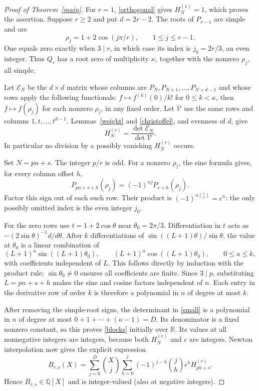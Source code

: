\documentclass[10pt]{article}
\begin{document}
\begin{proof}[Proof of Theorem~\ref{main}]
For $r=1$, \eqref{orthogonal} gives $H_N^{(1)}=1$, which proves
the assertion. Suppose $r\ge2$ and put $d=2r-2$.
The roots of $P_{r-1}$ are simple and are
\[
 \rho_j=1+2\cos(j\pi/r),\qquad 1\le j\le r-1.
\]
One equals zero exactly when $3\mid r$, in which case its index is
$j_0=2r/3$, an even integer. Thus $Q_r$ has a root zero of
multiplicity $\kappa$, together with the nonzero $\rho_j$, all simple.

Let $\mathcal E_N$ be the $d\times d$ matrix whose columns are
$P_N,P_{N+1},\ldots,P_{N+d-1}$ and whose rows apply the following
functionals: $f\mapsto f^{(k)}(0)/k!$ for $0\le k<\kappa$, then
$f\mapsto f(\rho_j)$ for each nonzero $\rho_j$, in any fixed order.
Let $\mathcal V$ use the same rows and columns $1,t,\ldots,t^{d-1}$.
Lemmas~\ref{weight} and \ref{christoffel}, and evenness of $d$, give
\begin{equation}\label{small}
 H_N^{(r)}=\frac{\det\mathcal E_N}{\det\mathcal V}.
\end{equation}
In particular no division by a possibly vanishing $H_N^{(r)}$ occurs.

Set $N=pn+s$. The integer $p/r$ is odd. For a nonzero $\rho_j$,
the sine formula gives, for every column offset $h$,
\[
 P_{pn+s+h}(\rho_j)=(-1)^{nj}P_{s+h}(\rho_j).
\]
Factor this sign out of each such row. Their product is
$(-1)^{n\binom r2}=\epsilon^n$: the only possibly omitted index
is the even integer $j_0$.

For the zero rows use $t=1+2\cos\theta$ near $\theta_0=2\pi/3$.
Differentiation in $t$ acts as
$-(2\sin\theta)^{-1}d/d\theta$. After $k$ differentiations of
$\sin((L+1)\theta)/\sin\theta$, the value at $\theta_0$ is a
linear combination of
\[
 (L+1)^a\sin((L+1)\theta_0),\qquad
 (L+1)^a\cos((L+1)\theta_0),\qquad 0\le a\le k,
\]
with coefficients independent of $L$. This follows directly by
induction with the product rule; $\sin\theta_0\ne0$ ensures all
coefficients are finite. Since $3\mid p$, substituting $L=pn+s+h$
makes the sine and cosine factors independent of $n$.
Each entry in the derivative row of order $k$ is therefore a
polynomial in $n$ of degree at most $k$.

After removing the simple-root signs, the determinant in
\eqref{small} is a polynomial in $n$ of degree at most
$0+1+\cdots+(\kappa-1)=D$. Its denominator is a fixed nonzero
constant, so this proves \eqref{blocks} initially over $\mathbb R$.
Its values at all nonnegative integers are integers, because both
$H_N^{(r)}$ and $\epsilon$ are integers. Newton interpolation now
gives the explicit expression
\begin{equation}\label{newton}
 B_{r,s}(X)=\sum_{j=0}^{D}\binom Xj
 \sum_{h=0}^{j}(-1)^{j-h}\binom jh\epsilon^h H_{ph+s}^{(r)}.
\end{equation}
Hence $B_{r,s}\in\mathbb Q[X]$ and is integer-valued (also at
negative integers).


\end{proof}
\end{document}
